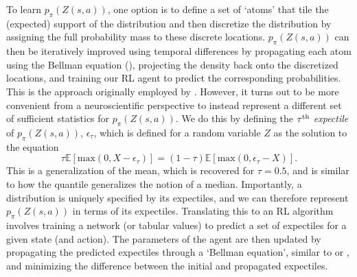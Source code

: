 To learn $p_\pi(Z(s, a))$, one option is to define a set of `atoms' that tile the (expected) support of the distribution and then discretize the distribution by assigning the full probability mass to these discrete locations.
$p_\pi(Z(s, a))$ can then be iteratively improved using temporal differences by propagating each atom using the Bellman equation (), projecting the density back onto the discretized locations, and training our RL agent to predict the corresponding probabilities.
This is the approach originally employed by \citep{bellemare2017distributional}.
However, it turns out to be more convenient from a neuroscientific perspective to instead represent a different set of sufficient statistics for $p_\pi(Z(s, a))$.
We do this by defining the $\tau\textsuperscript{th}$ \emph{expectile} of $p_\pi(Z(s, a))$, $\epsilon_\tau$, which is defined for a random variable $Z$ as the solution to the equation
\begin{equation}
    \tau \mathbb{E} [\text{max}(0, X - \epsilon_\tau)] = (1-\tau) \mathbb{E} [\text{max}(0, \epsilon_\tau - X)].
\end{equation}
This is a generalization of the mean, which is recovered for $\tau = 0.5$, and is similar to how the quantile generalizes the notion of a median.
Importantly, a distribution is uniquely specified by its expectiles, and we can therefore represent $p_\pi(Z(s, a))$ in terms of its expectiles.
Translating this to an RL algorithm involves training a network (or tabular values) to predict a set of expectiles for a given state (and action).
The parameters of the agent are then updated by propagating the predicted expectiles through a `Bellman equation', similar to  or , and minimizing the difference between the initial and propagated expectiles.


